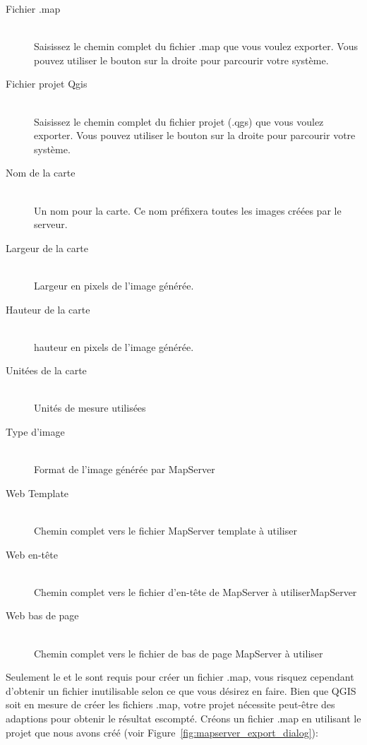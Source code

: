 \begin{description}
\item [Fichier .map] \mbox{}\\
Saisissez le chemin complet du fichier .map que vous voulez exporter. Vous pouvez utiliser le bouton sur la droite pour parcourir votre système.
\item [Fichier projet Qgis] \mbox{}\\
Saisissez le chemin complet du fichier projet (.qgs) que vous voulez exporter. Vous pouvez utiliser le bouton sur la droite pour parcourir votre système.
\item [Nom de la carte] \mbox{}\\
Un nom pour la carte. Ce nom préfixera toutes les images créées par le serveur.
\item [Largeur de la carte] \mbox{}\\
Largeur en pixels de l'image générée.
\item [Hauteur de la carte] \mbox{}\\
hauteur en pixels de l'image générée.
\item [Unitées de la carte] \mbox{}\\
Unités de mesure utilisées
\item [Type d'image] \mbox{}\\
Format de l'image générée par MapServer
\item [Web Template] \mbox{}\\
Chemin complet vers le fichier MapServer template à utiliser
\item [Web en-tête] \mbox{}\\
Chemin complet vers le fichier d'en-tête de MapServer à utiliserMapServer
\item [Web bas de page] \mbox{}\\
Chemin complet vers le fichier de bas de page MapServer à utiliser
\end{description}

Seulement le  et le  sont requis pour créer un fichier .map, vous risquez cependant d'obtenir un fichier inutilisable selon ce que vous désirez en faire. Bien que QGIS soit en mesure de créer les fichiers .map, votre projet nécessite peut-être des adaptions pour obtenir le résultat escompté. Créons un fichier .map en utilisant le projet  que nous avons créé (voir Figure~\ref{fig:mapserver_export_dialog}):



